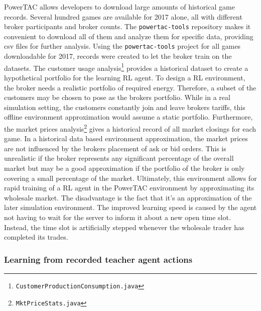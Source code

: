 \ac{PowerTAC} allows developers to download large amounts of historical game records. Several hundred games are
available for 2017 alone, all with different broker participants and broker counts. The \texttt{powertac-tools}
repository makes it convenient to download all  of them and analyze them for specific data, providing csv files for
further analysis. Using the \texttt{powertac-tools} project for all games downloadable for 2017, records were created to
let the broker train on the datasets. The customer usage analysis\footnote{\texttt{CustomerProductionConsumption.java}}
provides a historical dataset to create a hypothetical portfolio for the learning \ac{RL} agent. To design a \ac{RL}
environment, the broker needs a realistic portfolio of required energy. Therefore, a subset of the customers may be
chosen to pose as the brokers portfolio. While in a real simulation setting, the customers constantly join and leave
brokers tariffs, this offline environment approximation would assume a static portfolio. Furthermore, the market prices
analysis\footnote{\texttt{MktPriceStats.java}} gives a historical record of all market closings for each game. In a
historical data based environment approximation, the market prices are not influenced by the brokers placement of ask
or bid orders. This is unrealistic if the broker represents any significant percentage of the overall market but may be
a good approximation if the portfolio of the broker is only covering a small percentage of the market. Ultimately, this
environment allows for rapid training of a \ac{RL} agent in the \ac{PowerTAC} environment by approximating its wholesale
market. The disadvantage is the fact that it's an approximation of the later simulation environment. The improved learning speed 
is caused by the agent not having to wait for the server to inform it about a new open time slot. Instead, the
time slot is artificially stepped whenever the wholesale trader has completed its trades.

\subsubsection{Learning from recorded teacher agent actions}%
\label{ssub:learning_from_historical_actions_of_teacher_agents}

